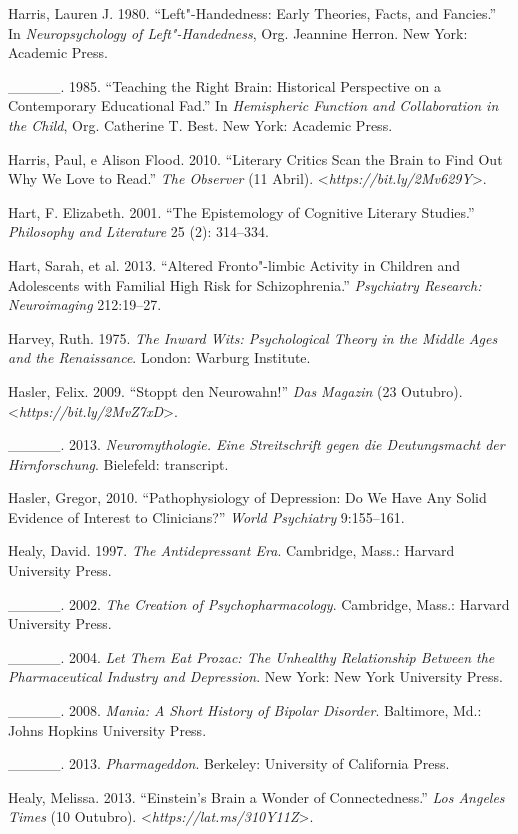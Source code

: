 {\begin{Parskip}
Harris, Lauren J. 1980. ``Left"-Handedness: Early Theories, Facts, and
Fancies.'' In \emph{Neuropsychology of Left"-Handedness}, Org. Jeannine
Herron. New York: Academic Press.

\_\_\_\_\_. 1985. ``Teaching the Right Brain: Historical Perspective on a
Contemporary Educational Fad.'' In \emph{Hemispheric Function and
Collaboration in the Child}, Org. Catherine T. Best. New York: Academic
Press.

Harris, Paul, e Alison Flood. 2010. ``Literary Critics Scan the Brain to
Find Out Why We Love to Read.'' \emph{The Observer} (11 Abril).
\textless{}\emph{https://bit.ly/2Mv629Y}\textgreater{}.

Hart, F. Elizabeth. 2001. ``The Epistemology of Cognitive Literary
Studies.'' \emph{Philosophy and Literature} 25 (2): 314--334.

Hart, Sarah, et al. 2013. ``Altered Fronto"-limbic Activity in Children
and Adolescents with Familial High Risk for Schizophrenia.''
\emph{Psychiatry Research: Neuroimaging} 212:19--27.

Harvey, Ruth. 1975. \emph{The Inward Wits: Psychological Theory in the
Middle Ages and the Renaissance}. London: Warburg Institute.

Hasler, Felix. 2009. ``Stoppt den Neurowahn!'' \emph{Das Magazin} (23
Outubro).
\textless{}\emph{https://bit.ly/2MvZ7xD}\textgreater{}.

\_\_\_\_\_. 2013. \emph{Neuromythologie. Eine Streitschrift gegen die
Deutungsmacht der Hirnforschung}. Bielefeld: transcript.

Hasler, Gregor, 2010. ``Pathophysiology of Depression: Do We Have Any
Solid Evidence of Interest to Clinicians?'' \emph{World Psychiatry}
9:155--161.

Healy, David. 1997. \emph{The Antidepressant Era}. Cambridge, Mass.:
Harvard University Press.

\_\_\_\_\_. 2002. \emph{The Creation of Psychopharmacology}. Cambridge,
Mass.: Harvard University Press.

\_\_\_\_\_. 2004. \emph{Let Them Eat Prozac: The Unhealthy Relationship
Between the Pharmaceutical Industry and Depression}. New York: New York
University Press.

\_\_\_\_\_. 2008. \emph{Mania: A Short History of Bipolar Disorder}.
Baltimore, Md.: Johns Hopkins University Press.

\_\_\_\_\_. 2013. \emph{Pharmageddon}. Berkeley: University of California
Press.

Healy, Melissa. 2013. ``Einstein's Brain a Wonder of Connectedness.''
\emph{Los Angeles Times} (10 Outubro).
\textless{}\emph{https://lat.ms/310Y11Z}\textgreater{}.


\end{Parskip}}
